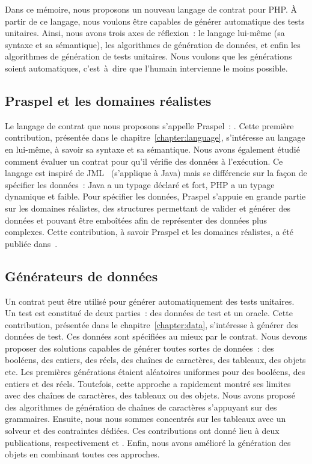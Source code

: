 Dans ce mémoire, nous proposons un nouveau langage de contrat pour PHP. À partir
de ce langage, nous voulons être capables de générer automatique des tests
unitaires. Ainsi, nous avons trois axes de réflexion~: le langage lui-même (sa
syntaxe et sa sémantique), les algorithmes de génération de données, et enfin
les algorithmes de génération de tests unitaires. Nous voulons que les
générations soient automatiques, c'est~à~dire que l'humain intervienne le moins
possible.

\subsection{Praspel et les domaines réalistes}

Le langage de contrat que nous proposons s'appelle {\strong Praspel}~:
. Cette première
contribution, présentée dans le chapitre~\ref{chapter:language}, s'intéresse au
langage en lui-même, à savoir sa syntaxe et sa sémantique. Nous avons également
étudié comment évaluer un contrat pour qu'il vérifie des données à l'exécution.
Ce langage est inspiré de JML~ (s'applique à Java) mais se
différencie sur la façon de spécifier les données~: Java a un typage déclaré et
fort, PHP a un typage dynamique et faible. Pour spécifier les données, Praspel
s'appuie en grande partie sur les {\strong domaines réalistes}, des structures
permettant de valider et générer des données et pouvant être emboîtées afin de
représenter des données plus complexes. Cette contribution, à savoir Praspel et
les domaines réalistes, a été publiée dans~.

\subsection{Générateurs de données}

Un contrat peut être utilisé pour générer automatiquement des tests unitaires.
Un test est constitué de deux parties~: des données de test et un oracle. Cette
contribution, présentée dans le chapitre~\ref{chapter:data}, s'intéresse à
générer des données de test. Ces données sont spécifiées au mieux par le
contrat. Nous devons proposer des solutions capables de générer toutes sortes de
données~: des booléens, des entiers, des réels, des chaînes de caractères, des
tableaux, des objets etc. Les premières générations étaient aléatoires uniformes
pour des booléens, des entiers et des réels. Toutefois, cette approche a
rapidement montré ses limites avec des chaînes de caractères, des tableaux ou
des objets. Nous avons proposé des algorithmes de génération de chaînes de
caractères s'appuyant sur des grammaires. Ensuite, nous nous sommes concentrés
sur les tableaux avec un solveur et des contraintes dédiées. Ces contributions
ont donné lieu à deux publications, respectivement  et
. Enfin, nous avons amélioré la génération des objets en
combinant toutes ces approches.

